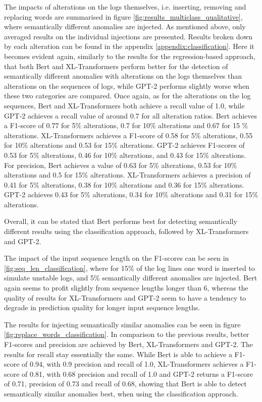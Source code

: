 The impacts of alterations on the logs themselves, i.e. inserting, removing and replacing words are summarised in figure \ref{fig:results_multiclass_qualitative}, where semantically different anomalies are injected. As mentioned above, only averaged results on the individual injections are presented. Results broken down by each alteration can be found in the appendix \ref{appendix:classification}.
Here it becomes evident again, similarly to the results for the regression-based approach, that both Bert and XL-Transformers perform better for the detection of semantically different anomalies with alterations on the logs themselves than alterations on the sequences of logs, while GPT-2 performs slightly worse when these two categories are compared. Once again, as for the alterations on the log sequences, Bert and XL-Transformers both achieve a recall value of 1.0, while GPT-2 achieves a recall value of around 0.7 for all alteration ratios. Bert achieves a F1-score of 0.77 for 5\% alterations, 0.7 for 10\% alterations and 0.67 for 15 \% alterations. XL-Transformers achieves a F1-score of 0.58 for 5\% alterations, 0.55 for 10\% alterations and 0.53 for 15\% alterations. GPT-2 achieves F1-scores of 0.53 for 5\% alterations, 0.46 for 10\% alterations, and 0.43 for 15\% alterations. For precision, Bert achieves a value of 0.63 for 5\% alterations, 0.53 for 10\% alterations and 0.5 for 15\% alterations. XL-Transformers achieves a precision of 0.41 for 5\% alterations, 0.38 for 10\% alterations and 0.36 for 15\% alterations. GPT-2 achieves 0.43 for 5\% alterations, 0.34 for 10\% alterations and 0.31 for 15\% alterations.

Overall, it can be stated that Bert performs best for detecting semantically different results using the classification approach, followed by XL-Transformers and GPT-2.

The impact of the input sequence length on the F1-scores can be seen in \ref{fig:seq_len_classification}, where for 15\% of the log lines one word is inserted to simulate unstable logs, and 5\% semantically different anomalies are injected. Bert again seems to profit slightly from sequence lengths longer than 6, whereas the quality of results for XL-Transformers and GPT-2 seem to have a tendency to degrade in prediction quality for longer input sequence lengths. 

The results for injecting semantically similar anomalies can be seen in figure \ref{fig:replace_words_classification}. In comparison to the previous results, better F1-scores and precision are achieved by Bert, XL-Transformers and GPT-2. The results for recall stay essentially the same. While Bert is able to achieve a F1-score of 0.94, with 0.9 precision and recall of 1.0, XL-Transformers achieves a F1-score of 0.81, with 0.68 precision and recall of 1.0 and GPT-2 returns a F1-score of 0.71, precision of 0.73 and recall of 0.68, showing that Bert is able to detect semantically similar anomalies best, when using the classification approach.

